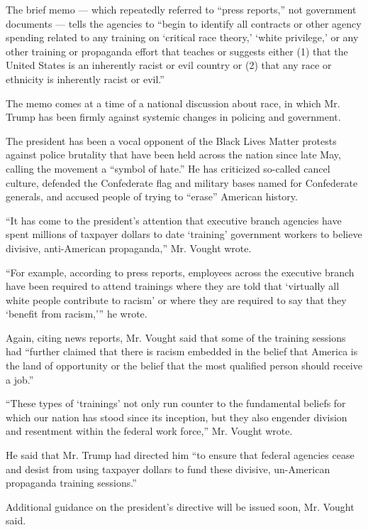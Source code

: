 The brief memo --- which repeatedly referred to ``press reports,'' not
government documents --- tells the agencies to ``begin to identify all
contracts or other agency spending related to any training on `critical
race theory,' `white privilege,' or any other training or propaganda
effort that teaches or suggests either (1) that the United States is an
inherently racist or evil country or (2) that any race or ethnicity is
inherently racist or evil.''

The memo comes at a time of a national discussion about race, in which
Mr. Trump has been firmly against systemic changes in policing and
government.

The president has been a vocal opponent of the Black Lives Matter
protests against police brutality that have been held across the nation
since late May, calling the movement a ``symbol of hate.'' He has
criticized so-called cancel culture, defended the Confederate flag and
military bases named for Confederate generals, and accused people of
trying to ``erase'' American history.

``It has come to the president's attention that executive branch
agencies have spent millions of taxpayer dollars to date `training'
government workers to believe divisive, anti-American propaganda,'' Mr.
Vought wrote.

``For example, according to press reports, employees across the
executive branch have been required to attend trainings where they are
told that `virtually all white people contribute to racism' or where
they are required to say that they `benefit from racism,''' he wrote.

Again, citing news reports, Mr. Vought said that some of the training
sessions had ``further claimed that there is racism embedded in the
belief that America is the land of opportunity or the belief that the
most qualified person should receive a job.''

``These types of `trainings' not only run counter to the fundamental
beliefs for which our nation has stood since its inception, but they
also engender division and resentment within the federal work force,''
Mr. Vought wrote.

He said that Mr. Trump had directed him ``to ensure that federal
agencies cease and desist from using taxpayer dollars to fund these
divisive, un-American propaganda training sessions.''

Additional guidance on the president's directive will be issued soon,
Mr. Vought said.

